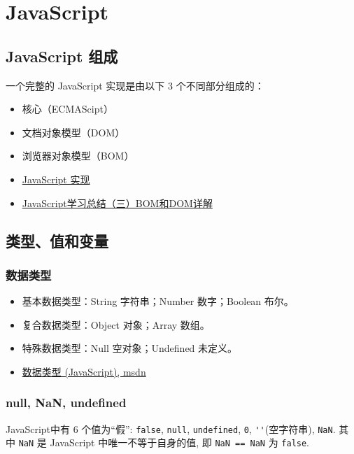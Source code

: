 \section{JavaScript}\label{javascript}

\subsection{JavaScript 组成}\label{javascript-ux7ec4ux6210}

一个完整的 JavaScript 实现是由以下 3 个不同部分组成的：

\begin{itemize}
\item
  核心（ECMAScipt）
\item
  文档对象模型（DOM）
\item
  浏览器对象模型（BOM）
\item
  \href{http://www.w3school.com.cn/js/pro_js_implement.asp}{JavaScript
  实现}
\item
  \href{http://segmentfault.com/a/1190000000654274}{JavaScript学习总结（三）BOM和DOM详解}
\end{itemize}

\subsection{类型、值和变量}\label{ux7c7bux578bux503cux548cux53d8ux91cf}

\subsubsection{数据类型}\label{ux6570ux636eux7c7bux578b}

\begin{itemize}
\item
  基本数据类型：String 字符串；Number 数字；Boolean 布尔。
\item
  复合数据类型：Object 对象；Array 数组。
\item
  特殊数据类型：Null 空对象；Undefined 未定义。
\item
  \href{https://msdn.microsoft.com/zh-cn/library/7wkd9z69(v=vs.94).aspx}{数据类型
  (JavaScript), msdn}
\end{itemize}

\subsubsection{null, NaN, undefined}\label{null-nan-undefined}

JavaScript中有 6 个值为``假'': \lstinline!false!, \lstinline!null!,
\lstinline!undefined!, \lstinline!0!, \lstinline!''!(空字符串),
\lstinline!NaN!. 其中 \lstinline!NaN! 是 JavaScript
中唯一不等于自身的值, 即 \lstinline!NaN == NaN! 为 \lstinline!false!.

